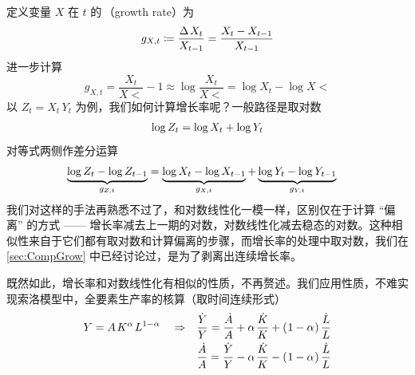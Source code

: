 定义变量 \(X\) 在 \(t\) 的\,（growth rate）为
\begin{equation}
    g_{X,t}\coloneq\dfrac{\D X_t}{X\lt}=\dfrac{X_t-X\lt}{X\lt}
\end{equation}
进一步计算
\begin{equation}
    g_{X,t}=\frac{X_t}{X\lt}-1\approx\log\frac{X_t}{X\lt}=\log X_t-\log X\lt\label{eq:GrowRateLog}
\end{equation}
以 \(Z_t=X_t\,Y_t\) 为例，我们如何计算增长率呢？一般路径是取对数
\begin{equation}
    \log Z_t=\log X_t+\log Y_t\notag
\end{equation}
对等式两侧作差分运算
\begin{align}
    \underbrace{\log Z_t-\log Z\lt}_{g_{Z,t}}&=\underbrace{\log X_t-\log X\lt}_{g_{X,t}}+\underbrace{\log Y_t-\log Y\lt}_{g_{Y,t}}\notag
\end{align}
我们对这样的手法再熟悉不过了，和对数线性化一模一样，区别仅在于计算 “偏离” 的方式 —— 增长率减去上一期的对数，对数线性化减去稳态的对数。这种相似性来自于它们都有取对数和计算偏离的步骤，而增长率的处理中取对数，我们在\ref{sec:CompGrow} 中已经讨论过，是为了剥离出连续增长率。

既然如此，增长率和对数线性化有相似的性质，不再赘述。我们应用性质，不难实现索洛模型中，全要素生产率的核算（取时间连续形式）
\begin{align*}
    Y=A\,K^\alpha\,L^{1-\alpha} \quad \Rightarrow \quad  & \grt Y = \grt A + \alpha\,\grt K + \bka{1-\alpha}\grt L\notag\\
    & \grt A = \grt Y - \alpha\,\grt K - \bka{1-\alpha}\grt L
\end{align*}



\SymmetricGeometry
